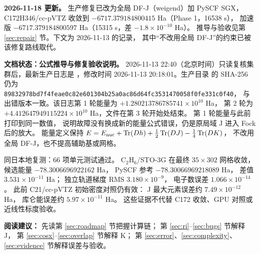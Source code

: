 \noindent\textbf{2026-11-18 更新。}
生产修复已改为全局 DF-J（weigend）加 PySCF SGX，
C172H346/cc-pVTZ 收敛到 \(-6717.379184800415\) Ha（Phase 1，16538 s），
加速版 \(-6717.379184800597\) Ha（15315 s，差 \(-1.8\times10^{-10}\) Ha）。
推导与验收见第 \ref{sec:repair} 节。下文为 2026-11-13 的记录，
其中“不改用全局 DF-J”的约束已被该修复路线取代。

\medskip
\noindent\textbf{文档状态：公式推导与修复验收说明。}
2026-11-13 22:40（北京时间）只读复核集群后，最新生产日志是
，修改时间
2026-11-13 20:18:01。生产目录  的 SHA-256 仍为
\texttt{89832978bd7f4feae0c82e601304b25a0ac86d64fc3531470058f0fe331c0f40}，
与出错版本一致。该日志第 1 轮能量为 \(+1.280213786785741\times10^{10}\) Ha，
第 2 轮为 \(+4.412647949115224\times10^{10}\) Ha，文件在第 3 轮开始处结束。
第 1 轮能量与此前  打印到同一数值，
说明故障没有换成新的能量公式错误，仍是原局域 J 进入 Fock 后的放大。
能量定义保持
\(E=E_{\mathrm{nuc}}+\operatorname{Tr}(Dh)+\frac12\operatorname{Tr}(DJ)-\frac14\operatorname{Tr}(DK)\)，
不改用全局 DF-J，也不提高辅助基或网格。

同日本地复测：66 项单元测试通过。
C\(_2\)H\(_6\)/STO-3G 在最终 \(35\times302\) 网格收敛，
候选能量 \(-78.3006696922162\) Ha，
PySCF 参考 \(-78.30066969218089\) Ha，
差值 \(3.531\times10^{-11}\) Ha；
独立轨道梯度 RMS \(3.180\times10^{-9}\)，
电子数误差 \(1.066\times10^{-14}\)。
此前 C21/cc-pVTZ 初始密度对照仍有效：
J 最大元素误差约 \(7.49\times10^{-12}\) Ha，
库仑能误差约 \(5.97\times10^{-11}\) Ha。
这些证据不代替 C172 收敛、GPU 对照或近线性标度验收。

\medskip
\noindent\textbf{阅读建议：}
先读第 \ref{sec:roadmap} 节把握计算链；
第 \ref{sec:ri}--\ref{sec:bugs} 节解释 J，
第 \ref{sec:cosx}--\ref{sec:overlap} 节解释 K；
第 \ref{sec:error}、\ref{sec:complexity}、\ref{sec:evidence} 节解释误差与验收。
